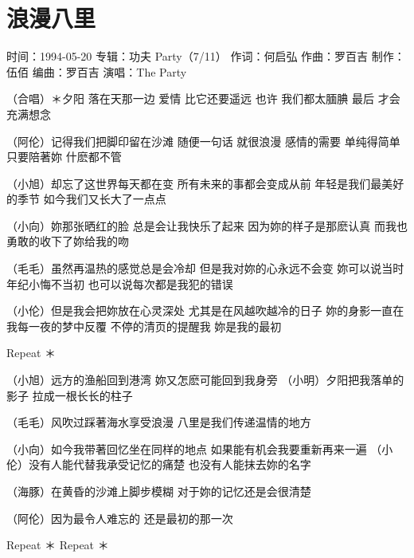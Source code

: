 \documentclass[UTF8,a4paper,oneside,twocolumn,12pt]{ctexbook}
\newcommand{\infopair}[2]{\textbullet #1：#2}
\newcommand{\zc}[1][伍佰]{\infopair{作词}{#1}}
\newcommand{\zq}[1][伍佰]{\infopair{作曲}{#1}}
\newcommand{\bq}[1][伍佰]{\infopair{编曲}{#1}}
\newcommand{\zj}[1]{\infopair{专辑}{#1}}
\newcommand{\zz}[1]{\infopair{制作}{#1}}
\newcommand{\sj}[1]{\infopair{时间}{#1}}
\newenvironment{info}{\begin{flushleft}\kaishu
	}
	{\end{flushleft}\normalsize\yahei\par}
\newenvironment{lyric}{
	}
{}
\begin{document}
\section{浪漫八里}
\begin{info}
	\sj{1994-05-20}
	\zj{功夫 Party（7/11）}
	\zc[何启弘]
	\zq[罗百吉]
	\zz{伍佰}
	\bq[罗百吉]
	\infopair{演唱}{The Party}
\end{info}
\begin{lyric}
	（合唱）＊夕阳 落在天那一边 爱情 比它还要遥远
	也许 我们都太腼腆 最后 才会充满想念

	（阿伦）记得我们把脚印留在沙滩 随便一句话 就很浪漫
	感情的需要 单纯得简单 只要陪著妳 什麽都不管

	（小旭）却忘了这世界每天都在变 所有未来的事都会变成从前
	年轻是我们最美好的季节 如今我们又长大了一点点

	（小向）妳那张晒红的脸 总是会让我快乐了起来
	因为妳的样子是那麽认真 而我也勇敢的收下了妳给我的吻

	（毛毛）虽然再温热的感觉总是会冷却 但是我对妳的心永远不会变
	妳可以说当时年纪小悔不当初 也可以说每次都是我犯的错误

	（小伦）但是我会把妳放在心灵深处 尤其是在风越吹越冷的日子
	妳的身影一直在我每一夜的梦中反覆
	不停的清页的提醒我 妳是我的最初

	Repeat ＊

	（小旭）远方的渔船回到港湾 妳又怎麽可能回到我身旁
	（小明）夕阳把我落单的影子 拉成一根长长的柱子

	（毛毛）风吹过踩著海水享受浪漫 八里是我们传递温情的地方

	（小向）如今我带著回忆坐在同样的地点
	如果能有机会我要重新再来一遍
	（小伦）没有人能代替我承受记忆的痛楚
	也没有人能抹去妳的名字

	（海豚）在黄昏的沙滩上脚步模糊 对于妳的记忆还是会很清楚

	（阿伦）因为最令人难忘的 还是最初的那一次

	Repeat ＊
	Repeat ＊
\end{lyric}
\end{document}

